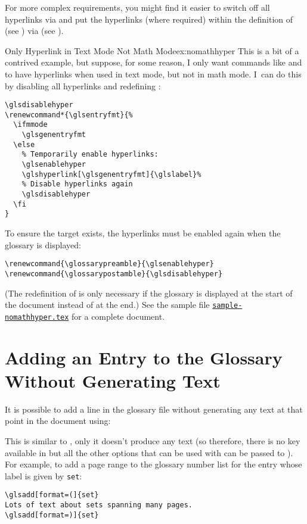 \documentclass[report,inlinetitle]{nlctdoc}
\renewcommand*{\glossarypreamble}{%
\emph{This glossary style was setup using:}
\begin{ttfamily}
\begin{tabbing}
\cs{usepackage}[\=xindy,\\
\+\>nonumberlist,\\
  toc,\\
  nopostdot,\\
  style=altlist,\\
  nogroupskip]\{glossaries\}
\end{tabbing}
\cs{glsnoexpandfields}\newline
\cs{renewcommand*}\{\ics{glsseeformat}\}[3][\ics{seename}]\{\% \newline
(\ics{xmakefirstuc}\{\#1\} \ics{glsseelist}\{\#2\}.)\}
\end{ttfamily}
}
\newcommand*{\gloskey}[2][newglossaryentry]{\csopt{#1}{#2}}
\newcounter{sample}
\newcommand*{\samplefile}[2][sample]{%
  \hyperref[ex:#1#2]{\texttt{#1#2.tex}}}
\begin{document}
For more complex requirements, you might find it easier to switch
off all hyperlinks via  and put the hyperlinks
(where required) within the definition of  (see
) via  (see
).

\begin{example}{Only Hyperlink in Text Mode Not Math
Mode}{ex:nomathhyper}
This is a bit of a contrived example, but suppose, for some reason,
I only want commands like  and  to have
hyperlinks when used in text mode, but not in math mode. I~can do
this by disabling all hyperlinks and redefining :
\begin{verbatim}
\glsdisablehyper
\renewcommand*{\glsentryfmt}{%
  \ifmmode
    \glsgenentryfmt
  \else
    % Temporarily enable hyperlinks:
    \glsenablehyper
    \glshyperlink[\glsgenentryfmt]{\glslabel}%
    % Disable hyperlinks again
    \glsdisablehyper
  \fi
}
\end{verbatim}
To ensure the target exists, the hyperlinks must be enabled again 
when the glossary is displayed:
\begin{verbatim}
\renewcommand{\glossarypreamble}{\glsenablehyper}
\renewcommand{\glossarypostamble}{\glsdisablehyper}
\end{verbatim}
(The redefinition of  is only necessary if
the glossary is displayed at the start of the document instead of at
the end.)
See the sample file \samplefile{-nomathhyper} for a complete
document.
\end{example}

\chapter{Adding an Entry to the Glossary Without Generating Text}
\label{sec:glsadd}

It is possible to add a line in the glossary file without
generating any text at that point in the document using:
\begin{definition}[\DescribeMacro{\glsadd}]
\end{definition}
This is similar to , only it doesn't produce
any text (so therefore, there is no \gloskey[glslink]{hyper} key
available in  but all the other options that can
be used with  can be passed to ).
For example, to add a page range to the glossary number list for the
entry whose label is given by \texttt{set}:
\begin{verbatim}
\glsadd[format=(]{set}
Lots of text about sets spanning many pages.
\glsadd[format=)]{set}
\end{verbatim}
\end{document}
